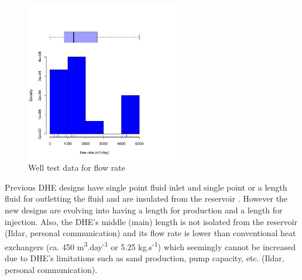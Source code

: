\documentclass[review,authoryear, 12pt]{elsarticle}\usepackage[]{graphicx}\usepackage[]{color}
\newenvironment{knitrout}{}{} %
\begin{document}
\begin{knitrout}
\color{fgcolor}\begin{figure}[]


{\centering \includegraphics[width=7cm,height=7cm]{figure/flowrate} 

}

\caption[Well test data for flow rate]{Well test data for flow rate\label{Fig:flowrate}}
\end{figure}


\end{knitrout}

Previous DHE designs have single point fluid inlet and single point or a length fluid for outletting the fluid and are insulated from the reservoir \citep{feng2012numerical}. However the new designs are evolving into having a length for production and a length for injection. Also, the DHE's middle (main) length is not isolated from the reservoir (Ildar, personal communication) and its flow rate is lower than conventional heat exchangers (ca. 450 m\textsuperscript{3}.day\textsuperscript{-1} or 5.25 kg.s\textsuperscript{-1}) \citep{feng2012numerical} which seemingly cannot be increased due to DHE's limitations such as sand production, pump capacity, etc. (Ildar, personal communication). 






\end{document}
